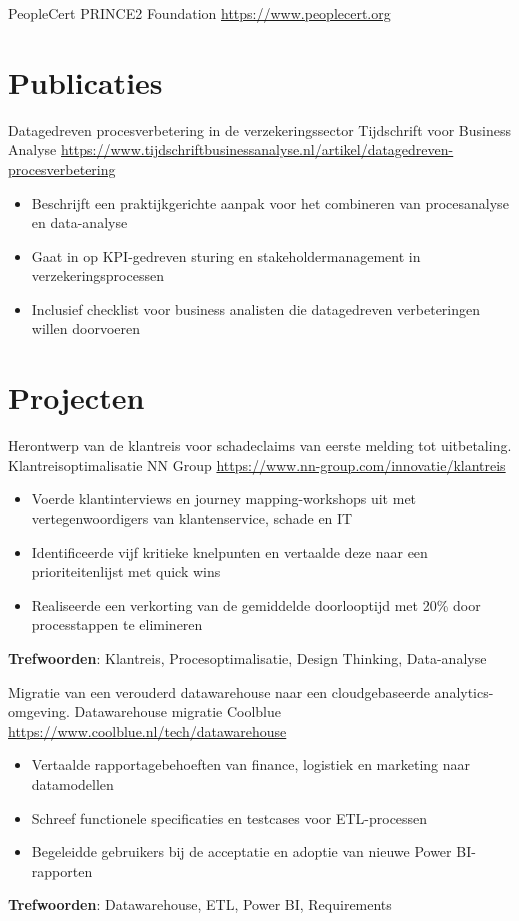 \documentclass[a4paper, serif, 10pt]{moderncv}
\begin{document}
        {PeopleCert}
        {PRINCE2 Foundation}
        {\url{https://www.peoplecert.org}}
        {}
        {}
\section{Publicaties}

        {Datagedreven procesverbetering in de verzekeringssector}
        {Tijdschrift voor Business Analyse}
        {\url{https://www.tijdschriftbusinessanalyse.nl/artikel/datagedreven-procesverbetering}}
        {}
        {\begin{itemize}
\item Beschrijft een praktijkgerichte aanpak voor het combineren van procesanalyse en data-analyse
\item Gaat in op KPI-gedreven sturing en stakeholdermanagement in verzekeringsprocessen
\item Inclusief checklist voor business analisten die datagedreven verbeteringen willen doorvoeren
\end{itemize}}
\section{Projecten}

        {Herontwerp van de klantreis voor schadeclaims van eerste melding tot uitbetaling.}
        {Klantreisoptimalisatie NN Group}
        {\url{https://www.nn-group.com/innovatie/klantreis}}
        {}
        {\begin{itemize}
\item Voerde klantinterviews en journey mapping-workshops uit met vertegenwoordigers van klantenservice, schade en IT
\item Identificeerde vijf kritieke knelpunten en vertaalde deze naar een prioriteitenlijst met quick wins
\item Realiseerde een verkorting van de gemiddelde doorlooptijd met 20\% door processtappen te elimineren
\end{itemize}
\textbf{Trefwoorden}: Klantreis, Procesoptimalisatie, Design Thinking, Data-analyse}

        {Migratie van een verouderd datawarehouse naar een cloudgebaseerde analytics-omgeving.}
        {Datawarehouse migratie Coolblue}
        {\url{https://www.coolblue.nl/tech/datawarehouse}}
        {}
        {\begin{itemize}
\item Vertaalde rapportagebehoeften van finance, logistiek en marketing naar datamodellen
\item Schreef functionele specificaties en testcases voor ETL-processen
\item Begeleidde gebruikers bij de acceptatie en adoptie van nieuwe Power BI-rapporten
\end{itemize}
\textbf{Trefwoorden}: Datawarehouse, ETL, Power BI, Requirements}
\end{document}
